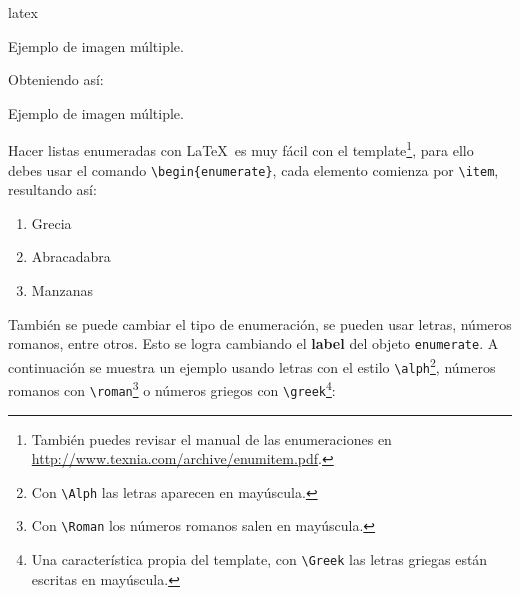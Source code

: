 \begin{sourcecode}{latex}{}
\begin{images}[\label{imagenmultiple}]{Ejemplo de imagen múltiple.}
	\imagesnewline
\end{images}
\end{sourcecode}

	Obteniendo así:

	\begin{images}{Ejemplo de imagen múltiple.}
		\imagesnewline
	\end{images}




		Hacer listas enumeradas con \LaTeX\ es muy fácil con el template\footnote{También puedes revisar el manual de las enumeraciones en \url{http://www.texnia.com/archive/enumitem.pdf}.}, para ello debes usar el comando \texttt{\textbackslash begin\{enumerate\}}, cada elemento comienza por \texttt{\textbackslash item}, resultando así:

		\begin{enumerate}
			\item Grecia
			\item Abracadabra
			\item Manzanas
		\end{enumerate}

		También se puede cambiar el tipo de enumeración, se pueden usar letras, números romanos, entre otros. Esto se logra cambiando el \textbf{label} del objeto \texttt{enumerate}. A continuación se muestra un ejemplo usando letras con el estilo \texttt{\textbackslash alph}\footnote{Con \texttt{\textbackslash Alph} las letras aparecen en mayúscula.}, números romanos con \texttt{\textbackslash roman}\footnote{Con \texttt{\textbackslash Roman} los números romanos salen en mayúscula.} o números griegos con \texttt{\textbackslash greek}\footnote{Una característica propia del template, con \texttt{\textbackslash Greek} las letras griegas están escritas en mayúscula.}:

